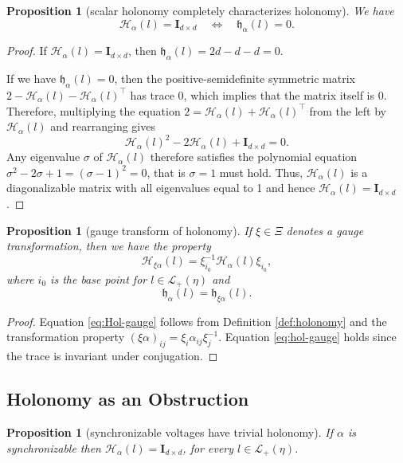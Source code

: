 \documentclass[10pt,reqno]{amsart}
\numberwithin{equation}{section}
\theoremstyle{bfnote}
\newtheorem{proposition}[theorem]{Proposition}
\theoremstyle{bfdef}
\newcommand{\mc}[1]{\mathcal{#1}}
\newcommand{\II}{\mathbf{I}_{d \times d}}
\providecommand\gt; %
\renewcommand{\gt}{\xi}
\providecommand\a; %
\renewcommand{\a}{\alpha}
\providecommand\Hol; %
\renewcommand{\Hol}{\mc{H}}
\providecommand\Lps; %
\renewcommand{\Lps}{\mc{L}}
\providecommand\hol; %
\renewcommand{\hol}{\mathfrak{h}}
\begin{document}
	\begin{proposition}[scalar holonomy completely characterizes holonomy]\label{prop:scalar-hol-hol}
		We have
		\begin{equation}
			\Hol_{\a}(l) = \II \quad\iff\quad
			\hol_{\a}(l) = 0 .
		\end{equation}
	\end{proposition}

	\begin{proof}
		\renewcommand\leo\sigma
		If $\Hol_{\a}(l) = \II$, then $\hol_{\a}(l) = 2d - d - d = 0$.

		If we have $\hol_{\a}(l) = 0$, then the positive-semidefinite symmetric matrix $2 - \Hol_{\a}(l) - \Hol_{\a}(l)^{\top}$ has trace 0, which implies that the matrix itself is 0. Therefore, multiplying the equation $2 = \Hol_{\a}(l) + \Hol_{\a}(l)^{\top}$ from the left by $\Hol_{\a}(l)$ and rearranging gives
		\begin{equation}\label{eq:hol-poly}
			\Hol_{\a}(l)^{2} - 2\Hol_{\a}(l) + \II = 0.
		\end{equation}
		Any eigenvalue $\leo$ of $\Hol_{\a}(l)$ therefore satisfies the polynomial equation $\leo^{2} - 2 \leo + 1 = (\leo - 1)^{2} = 0$, that is $\leo = 1$ must hold. Thus, $\Hol_{\a}(l)$ is a diagonalizable matrix with all eigenvalues equal to 1 and hence $\Hol_{\a}(l) = \II$.
	\end{proof}


	\begin{proposition}[gauge transform of holonomy]\label{prop:ginv-hol}
		If $\gt \in \Xi$ denotes a gauge transformation, then we have the property
		\begin{equation}\label{eq:Hol-gauge}
			\Hol_{\gt \a} (l) = \gt_{i_0}^{-1} \Hol_{\a}(l) \gt_{i_{0}},
		\end{equation}
		where $i_0$ is the base point for $l \in \Lps_{+}(\eta)$ and
		\begin{equation}\label{eq:hol-gauge}
			\hol_{\a}(l) = \hol_{\gt \a}(l).
		\end{equation}
	\end{proposition}

	\begin{proof}
		Equation \eqref{eq:Hol-gauge} follows from  Definition \ref{def:holonomy} and the transformation property $(\gt \a)_{i j} = \gt_i \a_{i j} \gt_{j}^{-1}$. Equation \eqref{eq:hol-gauge} holds since the trace is invariant under conjugation.
	\end{proof}


\subsection{Holonomy as an Obstruction}
	\begin{proposition}[synchronizable voltages have trivial holonomy]\label{prop:triv-hol-sync}
		If $\a$ is synchronizable then $\Hol_\a(l) = \II$, for every $l \in \Lps_{+}(\eta)$.
	\end{proposition}
\end{document}
